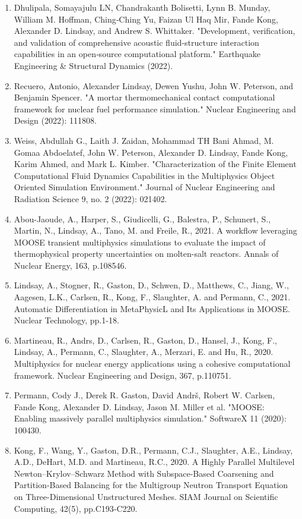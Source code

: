 \begin{enumerate}
  \item Dhulipala, Somayajulu LN, Chandrakanth Bolisetti, Lynn B. Munday, William M. Hoffman, Ching‐Ching Yu, Faizan Ul Haq Mir, Fande Kong, Alexander D. Lindsay, and Andrew S. Whittaker. "Development, verification, and validation of comprehensive acoustic fluid‐structure interaction capabilities in an open‐source computational platform." Earthquake Engineering \& Structural Dynamics (2022).
  \item Recuero, Antonio, Alexander Lindsay, Dewen Yushu, John W. Peterson, and Benjamin Spencer. "A mortar thermomechanical contact computational framework for nuclear fuel performance simulation." Nuclear Engineering and Design (2022): 111808.
  \item Weiss, Abdullah G., Laith J. Zaidan, Mohammad TH Bani Ahmad, M. Gomaa Abdoelatef, John W. Peterson, Alexander D. Lindsay, Fande Kong, Karim Ahmed, and Mark L. Kimber. "Characterization of the Finite Element Computational Fluid Dynamics Capabilities in the Multiphysics Object Oriented Simulation Environment." Journal of Nuclear Engineering and Radiation Science 9, no. 2 (2022): 021402.
  \item Abou-Jaoude, A., Harper, S., Giudicelli, G., Balestra, P., Schunert, S., Martin, N., Lindsay, A., Tano, M. and Freile, R., 2021. A workflow leveraging MOOSE transient multiphysics simulations to evaluate the impact of thermophysical property uncertainties on molten-salt reactors. Annals of Nuclear Energy, 163, p.108546.
  \item Lindsay, A., Stogner, R., Gaston, D., Schwen, D., Matthews, C., Jiang, W., Aagesen, L.K., Carlsen, R., Kong, F., Slaughter, A. and Permann, C., 2021. Automatic Differentiation in MetaPhysicL and Its Applications in MOOSE. Nuclear Technology, pp.1-18.
  \item Martineau, R., Andrs, D., Carlsen, R., Gaston, D., Hansel, J., Kong, F., Lindsay, A., Permann, C., Slaughter, A., Merzari, E. and Hu, R., 2020. Multiphysics for nuclear energy applications using a cohesive computational framework. Nuclear Engineering and Design, 367, p.110751.
  \item Permann, Cody J., Derek R. Gaston, David Andrš, Robert W. Carlsen, Fande Kong, Alexander D. Lindsay, Jason M. Miller et al. "MOOSE: Enabling massively parallel multiphysics simulation." SoftwareX 11 (2020): 100430.
  \item Kong, F., Wang, Y., Gaston, D.R., Permann, C.J., Slaughter, A.E., Lindsay, A.D., DeHart, M.D. and Martineau, R.C., 2020. A Highly Parallel Multilevel Newton--Krylov--Schwarz Method with Subspace-Based Coarsening and Partition-Based Balancing for the Multigroup Neutron Transport Equation on Three-Dimensional Unstructured Meshes. SIAM Journal on Scientific Computing, 42(5), pp.C193-C220.

\end{enumerate}
